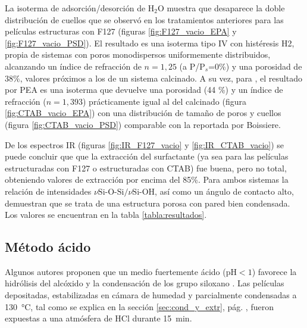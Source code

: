 		 La isoterma de adsorción/desorción de H$_2$O muestra que desaparece la doble distribución de cuellos que se observó en los tratamientos anteriores para las películas estructuras con F127 (figuras \ref{fig:F127_vacio_EPA} y \ref{fig:F127_vacio_PSD}). El resultado es una isoterma tipo IV con histéresis H2, propia de sistemas con poros monodispersos uniformemente distribuidos, alcanzando un índice de refracción de $n=1,25$ (a P/P$_s$=0\%) y una porosidad de $38\%$, valores próximos a los de un sistema calcinado. A su vez, para \pdmC, el resultado por PEA es una isoterma que devuelve una porosidad (44 \%) y un índice de refracción ($n=1,393$) prácticamente igual al del calcinado (figura \ref{fig:CTAB_vacio_EPA}) con una distribución de tamaño de poros y cuellos (figura \ref{fig:CTAB_vacio_PSD}) comparable con la reportada por Boissiere\cite{Boissiere2005}.

		 De los espectros IR  (figuras \ref{fig:IR_F127_vacio} y \ref{fig:IR_CTAB_vacio}) se puede concluir que que la extracción del surfactante (ya sea para las películas estructuradas con F127 o estructuradas con CTAB) fue buena, pero no total, obteniendo valores de extracción por encima del 85\%. Para ambos sistemas la relación de intensidades $\nu{\text{Si-O-Si/}}\nu{\text{Si-OH}}$, así como un ángulo de contacto alto, demuestran que se trata de una estructura porosa con pared bien condensada. Los valores se encuentran en la tabla \ref{tabla:resultados}.


	 \subsection{Método ácido}

	 	 Algunos autores proponen que un medio fuertemente ácido (pH$<1$) favorece la hidrólisis del alcóxido y la condensación de los grupo siloxano \cite{Soler-Illia2011,Doshi2000a,Huo1996,Boissiere2000,Beck1992}. Las películas depositadas, estabilizadas en cámara de humedad y  parcialmente condensadas a \SI{130}{\celsius}, tal como se explica en la sección \ref{sec:cond_y_extr}, pág. \pageref{sec:cond_y_extr}, fueron expuestas a una atmósfera de HCl durante \SI{15}{\minute}. 


